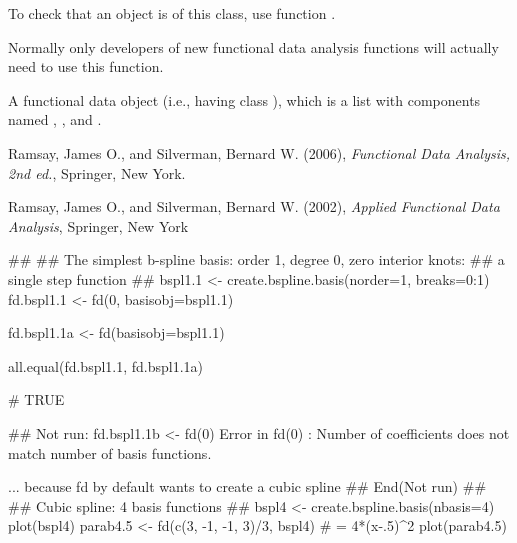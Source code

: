 \begin{Details}\relax
To check that an object is of this class, use function
.

Normally only developers of new functional data analysis
functions will actually need to use this function.
\end{Details}
\begin{Value}
A functional data object (i.e., having class ), which is a
list with components named , , and
.
\end{Value}
\begin{Source}\relax
Ramsay, James O., and Silverman, Bernard W. (2006), \emph{Functional
Data Analysis, 2nd ed.}, Springer, New York.

Ramsay, James O., and Silverman, Bernard W. (2002), \emph{Applied
Functional Data Analysis}, Springer, New York
\end{Source}
\begin{SeeAlso}\relax
{} 
\end{SeeAlso}
\begin{Examples}
\begin{ExampleCode}
##
## The simplest b-spline basis:  order 1, degree 0, zero interior knots:  
##       a single step function 
##
bspl1.1 <- create.bspline.basis(norder=1, breaks=0:1)
fd.bspl1.1 <- fd(0, basisobj=bspl1.1)

fd.bspl1.1a <- fd(basisobj=bspl1.1)

all.equal(fd.bspl1.1, fd.bspl1.1a)

# TRUE

## Not run: 
fd.bspl1.1b <- fd(0)
Error in fd(0) : 
  Number of coefficients does not match number of basis functions.

... because fd by default wants to create a cubic spline 
## End(Not run)
##
## Cubic spline:  4  basis functions 
##
bspl4 <- create.bspline.basis(nbasis=4)
plot(bspl4) 
parab4.5 <- fd(c(3, -1, -1, 3)/3, bspl4)
# = 4*(x-.5)^2
plot(parab4.5) 

\end{ExampleCode}
\end{Examples}

